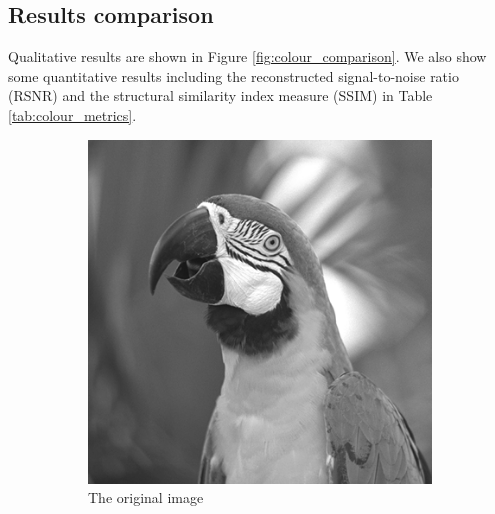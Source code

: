 \documentclass{article}
\begin{document}
\subsection*{Results comparison} \label{sec:results_gray}
Qualitative results are shown in Figure \ref{fig:colour_comparison}. We also show some quantitative results including the reconstructed signal-to-noise ratio (RSNR) and the structural similarity index measure (SSIM) in Table \ref{tab:colour_metrics}.

\begin{figure}[htbp]     
    \centering
    \begin{subfigure}[b]{0.24\textwidth}
        \centering
        \includegraphics[width=\textwidth]{images/gray.png}
        \caption{The original image}
        \label{fig:colour}
    \end{subfigure}
    \begin{subfigure}[b]{0.24\textwidth}
        \centering

\end{subfigure}
\end{figure}
\end{document}
